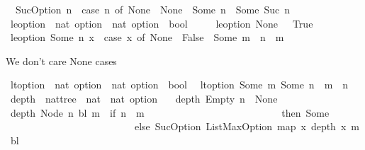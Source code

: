 \begin{isabellebody}
\ \ {\isachardoublequoteopen}SucOption\ n\ {\isacharequal}\ {\isacharparenleft}case\ n\ of\ None\ {\isasymRightarrow}\ None\ {\isacharbar}\ Some\ n\ {\isasymRightarrow}\ Some\ {\isacharparenleft}Suc\ n{\isacharparenright}{\isacharparenright}{\isachardoublequoteclose}\isanewline
\ \ \isanewline
{}\isamarkupfalse%
\ le{\isacharunderscore}option\ {\isacharcolon}{\isacharcolon}\ {\isachardoublequoteopen}nat\ option\ {\isasymRightarrow}\ nat\ option\ {\isasymRightarrow}\ bool{\isachardoublequoteclose}\ \ \ \isanewline
\ \ {\isachardoublequoteopen}le{\isacharunderscore}option\ None\ {\isacharunderscore}\ {\isacharequal}\ True{\isachardoublequoteclose}\isanewline
{\isacharbar}\ {\isachardoublequoteopen}le{\isacharunderscore}option\ {\isacharparenleft}Some\ n{\isacharparenright}\ x\ {\isacharequal}\ {\isacharparenleft}case\ x\ of\ None\ {\isasymRightarrow}\ False\ {\isacharbar}\ Some\ m\ {\isasymRightarrow}\ n\ {\isasymle}\ m{\isacharparenright}{\isachardoublequoteclose}%
\begin{isamarkuptext}%
We don't care None cases%
\end{isamarkuptext}\isamarkuptrue%
\isamarkupfalse%
\ lt{\isacharunderscore}option\ {\isacharcolon}{\isacharcolon}\ {\isachardoublequoteopen}nat\ option\ {\isasymRightarrow}\ nat\ option\ {\isasymRightarrow}\ bool{\isachardoublequoteclose}\ \isanewline
\ {\isachardoublequoteopen}lt{\isacharunderscore}option\ {\isacharparenleft}Some\ m{\isacharparenright}\ {\isacharparenleft}Some\ n{\isacharparenright}\ {\isacharequal}\ {\isacharparenleft}m\ {\isacharless}\ n{\isacharparenright}{\isachardoublequoteclose}\isanewline
\ \ \isanewline
{}\isamarkupfalse%
\ depth\ {\isacharcolon}{\isacharcolon}\ {\isachardoublequoteopen}nattree\ {\isasymRightarrow}\ nat\ {\isasymRightarrow}\ nat\ option{\isachardoublequoteclose}\ \isanewline
\ \ {\isachardoublequoteopen}depth\ Empty\ n\ {\isacharequal}\ None{\isachardoublequoteclose}\isanewline
{\isacharbar}\ {\isachardoublequoteopen}depth\ {\isacharparenleft}Node\ n\ bl{\isacharparenright}\ m\ {\isacharequal}\ {\isacharparenleft}if\ n\ {\isacharequal}\ m\ \isanewline
\ \ \ \ \ \ \ \ \ \ \ \ \ \ \ \ \ \ \ \ \ \ \ \ \ \ then\ {\isacharparenleft}Some\ {}{\isacharparenright}\ \isanewline
\ \ \ \ \ \ \ \ \ \ \ \ \ \ \ \ \ \ \ \ \ \ \ \ \ \ else\ SucOption\ {\isacharparenleft}ListMaxOption\ {\isacharparenleft}map\ {\isacharparenleft}{\isasymlambda}x{\isachardot}\ depth\ x\ m{\isacharparenright}\ bl{\isacharparenright}{\isacharparenright}{\isacharparenright}{\isachardoublequoteclose}\isanewline

\end{isabellebody}

